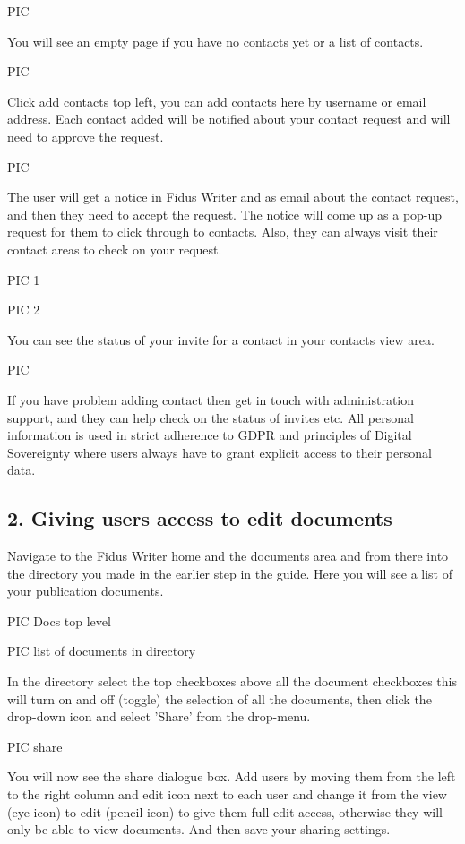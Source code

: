 \documentclass{article}
\begin{document}
PIC


You will see an empty page if you have no contacts yet or a list of contacts.


PIC


Click add contacts top left, you can add contacts here by username or email address. Each contact added will be notified about your contact request and will need to approve the request.


PIC


The user will get a notice in Fidus Writer and as email about the contact request, and then they need to accept the request. The notice will come up as a pop-up request for them to click through to contacts. Also, they can always visit their contact areas to check on your request.


PIC 1


PIC 2


You can see the status of your invite for a contact in your contacts view area.


PIC


If you have problem adding contact then get in touch with administration support, and they can help check on the status of invites etc. All personal information is used in strict adherence to GDPR and principles of Digital Sovereignty where users always have to grant explicit access to their personal data.


\subsection{2. Giving users access to edit documents}\label{H9350209}



Navigate to the Fidus Writer home and the documents area and from there into the directory you made in the earlier step in the guide. Here you will see a list of your publication documents.


PIC Docs top level


PIC list of documents in directory


In the directory select the top checkboxes above all the document checkboxes this will turn on and off (toggle) the selection of all the documents, then click the drop-down icon and select 'Share' from the drop-menu.


PIC share


You will now see the share dialogue box. Add users by moving them from the left to the right column and edit icon next to each user and change it from the view (eye icon) to edit (pencil icon) to give them full edit access, otherwise they will only be able to view documents. And then save your sharing settings. 
\end{document}
